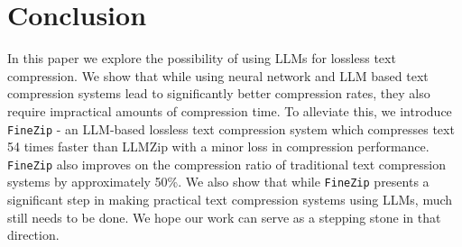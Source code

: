 \documentclass[11pt]{article}
\begin{document}



\section{Conclusion}
In this paper we explore the possibility of using LLMs for lossless text compression. We show that while using neural network and LLM based text compression systems lead to significantly better compression rates, they also require impractical amounts of compression time. To alleviate this, we introduce \texttt{FineZip} - an LLM-based lossless text compression system which compresses text 54 times faster than LLMZip with a minor loss in compression performance. \texttt{FineZip} also improves on the compression ratio of traditional text compression systems by approximately 50\%. We also show that while \texttt{FineZip} presents a significant step in making practical text compression systems using LLMs, much still needs to be done. We hope our work can serve as a stepping stone in that direction. 

\end{document}
